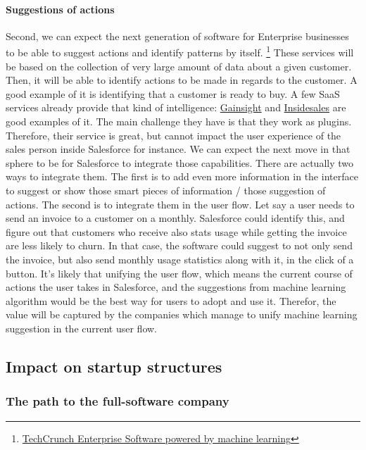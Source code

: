 \documentclass[12pt]{article}
\begin{document}
\paragraph{Suggestions of actions}

Second, we can expect the next generation of software for Enterprise businesses
to be able to suggest actions and identify patterns by itself.
\footnote{\href{http://techcrunch.com/2015/07/27/the-next-wave-of-enterprise-software-powered-by-machine-learning}
{TechCrunch Enterprise Software powered by machine learning}}
These services will be based on the collection of very large amount of data about
a given customer. Then, it will be able to identify actions to be made in regards
to the customer. A good example of it is identifying that a customer is ready to
buy. A few SaaS services already provide that kind of intelligence:
\href{http://www.gainsight.com/}{Gainsight} and
\href{http://uk.insidesales.com/}{Insidesales} are good examples of it.
The main challenge they have is that they work as plugins. Therefore, their
service is great, but cannot impact the user experience of the sales person
inside Salesforce for instance.
We can expect the next move in that sphere to be for Salesforce to integrate
those capabilities. There are actually two ways to integrate them. The first
is to add even more information in the interface to suggest or show those smart
pieces of information / those suggestion of actions. The second is to integrate
them in the user flow. Let say a user needs to send an invoice to a customer on
a monthly. Salesforce could identify this, and figure out that customers who
receive also stats usage while getting the invoice are less likely to churn. In
that case, the software could suggest to not only send the invoice, but also
send monthly usage statistics along with it, in the click of a button.
It's likely that unifying the user flow, which means the current course of
actions the user takes in Salesforce, and the suggestions from machine learning
algorithm would be the best way for users to adopt and use it. Therefor, the
value will be captured by the companies which manage to unify machine learning
suggestion in the current user flow.

\subsection{Impact on startup structures}

\subsubsection{The path to the full-software company}
\end{document}
